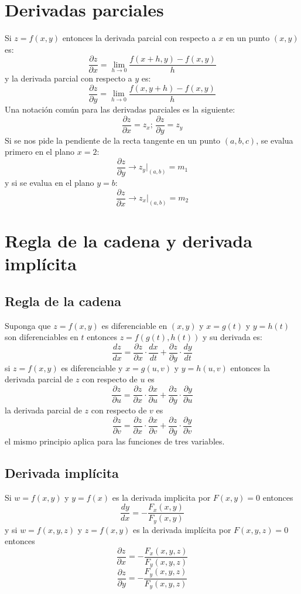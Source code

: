 \documentclass[letterpaper, 12pt]{article}
\begin{document}
        \section{Derivadas parciales}
        \justify
        Si \(z=f(x,y)\) entonces la derivada parcial con respecto a \(x\) en un punto \((x,y)\) es:
        \[\frac{\partial z}{\partial x}=\lim_{h\rightarrow 0}\frac{f(x+h,y)-f(x,y)}{h}\]
        y la derivada parcial con respecto a \(y\) es:
        \[\frac{\partial z}{\partial y}=\lim_{h\rightarrow 0}\frac{f(x,y+h)-f(x,y)}{h}\]
        Una notación común para las derivadas parciales es la siguiente:
        \[\frac{\partial z}{\partial x}=z_x;\,\frac{\partial z}{\partial y}=z_y\]
        Si se nos pide la pendiente de la recta tangente en un punto \((a,b,c)\), se evalua primero en el plano \(x=2\):
        \[\frac{\partial z}{\partial y}\rightarrow z_y\rvert_{(a,b)}=m_1\]
        y si se evalua en el plano \(y=b\):
        \[\frac{\partial z}{\partial x}\rightarrow z_x\rvert_{(a,b)}=m_2\]
        \section{Regla de la cadena y derivada implícita}
        \subsection*{Regla de la cadena}
        \justify
        Suponga que \(z=f(x,y)\) es diferenciable en \((x,y)\) y \(x=g(t)\) y \(y=h(t)\) son diferenciables en \(t\) entonces \(z=f(g(t),h(t))\) y su derivada es:
        \[\frac{dz}{dx}=\frac{\partial z}{\partial x}\cdot\frac{dx}{dt}+\frac{\partial z}{\partial y}\cdot\frac{dy}{dt}\]
        si \(z=f(x,y)\) es diferenciable y \(x=g(u,v)\) y \(y=h(u,v)\) entonces la derivada parcial de \(z\) con respecto de \(u\) es
        \[\frac{\partial z}{\partial u}=\frac{\partial z}{\partial x}\cdot\frac{\partial x}{\partial u}+\frac{\partial z}{\partial y}\cdot\frac{\partial y}{\partial u}\]
        la derivada parcial de \(z\) con respecto de \(v\) es
        \[\frac{\partial z}{\partial v}=\frac{\partial z}{\partial x}\cdot\frac{\partial x}{\partial v}+\frac{\partial z}{\partial y}\cdot\frac{\partial y}{\partial v}\]
        el mismo principio aplica para las funciones de tres variables.
        \subsection*{Derivada implícita}
        \justify
        Si \(w=f(x,y)\) y \(y=f(x)\) es la derivada implicita por \(F(x,y)=0\) entonces
        \[\frac{dy}{dx}=-\frac{F_x(x,y)}{F_y(x,y)}\]
        y si \(w=f(x,y,z)\) y \(z=f(x,y)\) es la derivada implícita por \(F(x,y,z)=0\) entonces
        \[\frac{\partial z}{\partial x}=-\frac{F_x(x,y,z)}{F_y(x,y,z)}\]
        \[\frac{\partial z}{\partial y}=-\frac{F_y(x,y,z)}{F_y(x,y,z)}\]
\end{document}
